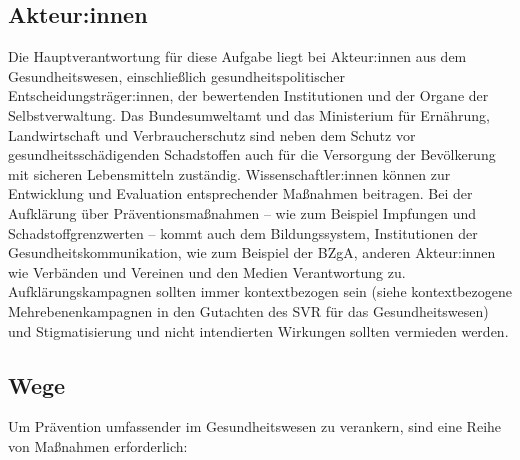 \documentclass{article}
\begin{document}
\subsection{Akteur:innen}\label{H1866663}



Die Hauptverantwortung für diese Aufgabe liegt bei Akteur:innen aus dem Gesundheitswesen, einschließlich gesundheitspolitischer Entscheidungsträger:innen, der bewertenden Institutionen und der Organe der Selbstverwaltung. Das Bundesumweltamt und das Ministerium für Ernährung, Landwirtschaft und Verbraucherschutz sind neben dem Schutz vor gesundheitsschädigenden Schadstoffen auch für die Versorgung der Bevölkerung mit sicheren Lebensmitteln zuständig. Wissenschaftler:innen können zur Entwicklung und Evaluation entsprechender Maßnahmen beitragen. Bei der Aufklärung über Präventionsmaßnahmen – wie zum Beispiel Impfungen und Schadstoffgrenzwerten – kommt auch dem Bildungssystem, Institutionen der Gesundheitskommunikation, wie zum Beispiel der BZgA, anderen Akteur:innen wie Verbänden und Vereinen und den Medien Verantwortung zu. Aufklärungskampagnen sollten immer kontextbezogen sein (siehe kontextbezogene Mehrebenenkampagnen in den Gutachten des SVR für das Gesundheitswesen) und Stigmatisierung und nicht intendierten Wirkungen sollten vermieden werden.


\subsection{Wege}\label{H3879915}



Um Prävention umfassender im Gesundheitswesen zu verankern, sind eine Reihe von Maßnahmen erforderlich: 
\end{document}
